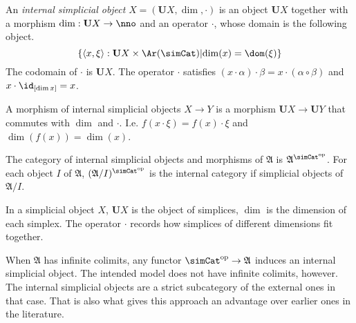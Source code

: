 \documentclass{tac}
\newcommand\hide[1]{}
\newcommand\set[1]{\left\{#1\right\}}
\newcommand\dual{^{\mathrm{op}}}
\newcommand\s{^{\simCat\dual}}
\newcommand\of{:}
\newcommand\tuplet[1]{\left\langle #1 \right\rangle}
\newcommand\ambient{\mathfrak A}
\begin{document}
\newcommand\base{\mathbf{U}}
\begin{definition} An \emph{internal simplicial object} $X=(\base X,\dim,\cdot)$ is an object $\base X$ together with a morphism $\dim\of \base X\to\nno$ and an operator $\cdot$, whose domain is the following object.
\[ \set{\tuplet{x,\xi}\of \base X\times\Ar(\simCat)\middle| \dim (x)=\dom(\xi)} \]
The codomain of $\cdot$ is $\base X$. The operator $\cdot$ satisfies $(x\cdot\alpha)\cdot\beta=x\cdot(\alpha\circ\beta)$ and $x\cdot\id_{[\dim x]}=x$.  

A morphism of internal simplicial objects $X\to Y$ is a morphism $\base X\to \base Y$ that commutes with $\dim$ and $\cdot$. I.e. $f(x\cdot \xi)=f(x)\cdot\xi$ and $\dim(f(x))=\dim(x)$.

The category of internal simplicial objects and morphisms of $\ambient$ is $\ambient\s$. For each object $I$ of $\ambient$, $(\ambient/I)\s$ is the internal category if simplicial objects of $\ambient/I$.
\end{definition}\hide{ Is it feasible to rewrite the whole paper with these?}

In a simplicial object $X$, $\base X$ is the object of simplices, $\dim$ is the dimension of each simplex. The operator $\cdot$ records how simplices of different dimensions fit together. 

\begin{remark} When $\ambient$ has infinite colimits, any functor $\simCat\dual\to\ambient$ induces an internal simplicial object. The intended model does not have infinite colimits, however. The internal simplicial objects are a strict subcategory of the external ones in that case. That is also what gives this approach an advantage over earlier ones in the literature.%
\end{remark}

\hide{
\subsection{Families}
\begin{defin}
For each object $I$ of $\ambient$ the category $\ambient/I\s$ of simplicial objects in the slice $\ambient/I$ is an \emph{$I$-indexed families of simplicial objects}. 
\end{defin}

Is there anything to prove here?

Other thought: maybe treat the equivalence of $\ambient\s/J$ with $\ambient^{EJ}\s$ here, with $EJ$ the category of elements of the simplicial set $J$.

}
\end{document}
